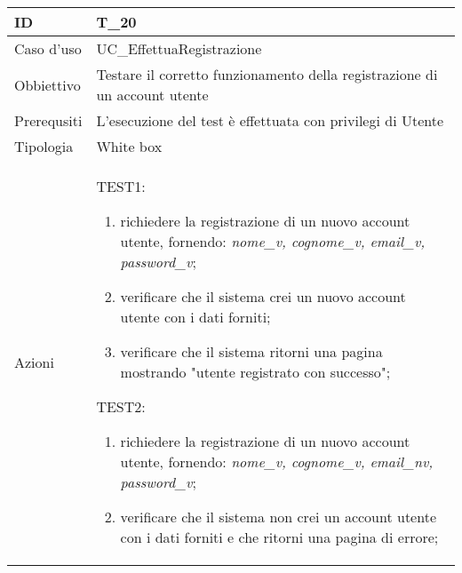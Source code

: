 \begin{table}[hb]
    \centering
    \begin{tabular}{ |p{2cm}|p{10cm}|  }
        \hline
        ID          & T\_20                                                                      \\\hline
        Caso d'uso  & UC\_EffettuaRegistrazione                                                  \\\hline
        Obbiettivo  & Testare il corretto funzionamento della registrazione di un account utente \\\hline
        Prerequsiti & L'esecuzione del test è effettuata con privilegi di Utente                 \\\hline
        Tipologia   & White box                                                                  \\\hline
        Azioni      &
        TEST1:
        \begin{enumerate}[nosep, topsep=0pt]
            \item richiedere la registrazione di un nuovo account utente, fornendo: \emph{nome\_v, cognome\_v, email\_v, password\_v};
            \item verificare che il sistema crei un nuovo account utente con i dati forniti;
            \item verificare che il sistema ritorni una pagina mostrando "utente registrato con successo";
        \end{enumerate}
        \vspace{0.5cm} TEST2:
        \begin{enumerate}[nosep, topsep=0pt]
            \item richiedere la registrazione di un nuovo account utente, fornendo: \emph{nome\_v, cognome\_v, email\_nv, password\_v};
            \item verificare che il sistema non crei un account utente con i dati forniti e che ritorni una pagina di errore;
        \end{enumerate}
        \\\hline
    \end{tabular}
\end{table}

